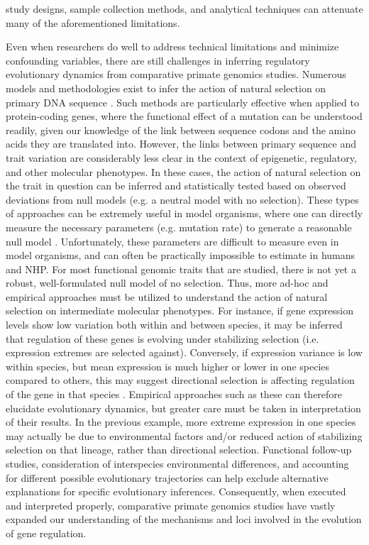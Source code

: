 {study designs, sample collection methods, and analytical techniques can attenuate many of the aforementioned limitations.

Even when researchers do well to address technical limitations and minimize confounding variables, there are still challenges in inferring regulatory evolutionary dynamics from comparative primate genomics studies. Numerous models and methodologies exist to infer the action of natural selection on primary DNA sequence \cite{Vitti Grossman and Sabeti 2013, Detecting Natural Selection in Genomic Data}. Such methods are particularly effective when applied to protein-coding genes, where the functional effect of a mutation can be understood readily, given our knowledge of the link between sequence codons and the amino acids they are translated into. However, the links between primary sequence and trait variation are considerably less clear in the context of epigenetic, regulatory, and other molecular phenotypes. In these cases, the action of natural selection on the trait in question can be inferred and statistically tested based on observed deviations from null models (e.g. a neutral model with no selection). These types of approaches can be extremely useful in model organisms, where one can directly measure the necessary parameters (e.g. mutation rate) to generate a reasonable null model \cite{Gilad Oshlack and Rifkin 2006, Natural selection on gene expression}. Unfortunately, these parameters are difficult to measure even in model organisms, and can often be practically impossible to estimate in humans and NHP. For most functional genomic traits that are studied, there is not yet a robust, well-formulated null model of no selection. Thus, more ad-hoc and empirical approaches must be utilized to understand the action of natural selection on intermediate molecular phenotypes. For instance, if gene expression levels show low variation both within and between species, it may be inferred that regulation of these genes is evolving under stabilizing selection (i.e. expression extremes are selected against). Conversely, if expression variance is low within species, but mean expression is much higher or lower in one species compared to others, this may suggest directional selection is affecting regulation of the gene in that species \cite{Romero, Ruvinsky, and Gilad 2012}. Empirical approaches such as these can therefore elucidate evolutionary dynamics, but greater care must be taken in interpretation of their results. In the previous example, more extreme expression in one species may actually be due to environmental factors and/or reduced action of stabilizing selection on that lineage, rather than directional selection. Functional follow-up studies, consideration of interspecies environmental differences, and accounting for different possible evolutionary trajectories can help exclude alternative explanations for specific evolutionary inferences. Consequently, when executed and interpreted properly, comparative primate genomics studies have vastly expanded our understanding of the mechanisms and loci involved in the evolution of gene regulation.

}
